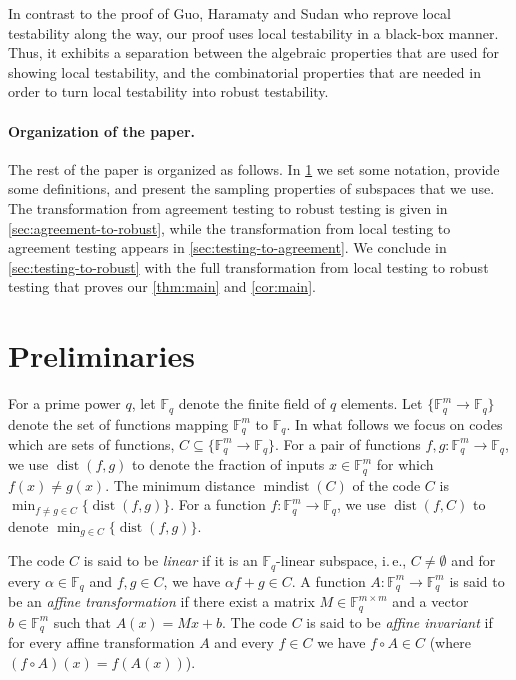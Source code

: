 \documentclass[11pt]{article}
\numberwithin{equation}{section}
\theoremstyle{definition}
\theoremstyle{plain}
\newcommand{\ie}{i.\,e.}
\theoremstyle{plain}
\DeclareMathOperator{\dist}{dist} %
\DeclareMathOperator{\mindist}{mindist}  %
\newcommand{\F}{{\mathbb{F}}}
\newcommand{\Func}[1]{\{\F_q^{#1} \to \F_q\}}
\begin{document}
In contrast to the proof of Guo, Haramaty and Sudan \cite{GuoHS2015} 
who reprove  local testability %
along %
the way, our proof uses local testability in a black-box manner. Thus, it exhibits a separation between the algebraic properties that are used for showing local testability, and the combinatorial properties that  are needed in order to turn local testability into robust testability.

%
%
%
%

%
\paragraph{Organization of the paper.}  %
The rest of the paper is organized as follows. In \cref{sec:prelim} we set some notation, provide some definitions, and present the sampling properties of subspaces that we use. The transformation from agreement testing to robust testing is given in \cref{sec:agreement-to-robust}, while the transformation from local testing to agreement testing
%
appears  %
in \cref{sec:testing-to-agreement}.
We %
%
%
conclude in %
\cref{sec:testing-to-robust} with the full transformation
from local testing to robust testing that proves 
our \cref{thm:main} and \cref{cor:main}.


\section{Preliminaries}\label{sec:prelim}

%
%
%
%
For a prime power $q$, let $\F_q$ denote the finite field of $q$ elements.
Let $\Func{m}$
denote the set of functions mapping $\F_q^m$ to  $\F_q$. In what follows
we focus on codes which are
%
sets  %
of functions, %
$C \subseteq \Func{m}$. For a pair of functions $f,g: \F_q^m \to \F_q$,
we use $\dist(f,g)$ to denote the
fraction of inputs $x \in \F_q^m$ for which $f(x) \ne g(x)$.
The  %
minimum distance   %
$\mindist(C)$ of the code $C$ is $\min_{f \neq g\in C}
\{\dist(f,g)\}$. For a function $f: \F_q^m \to \F_q$,
we use $\dist(f,C)$ to denote $\min_{g \in C}
\{\dist(f,g)\}$.  %

The code $C$ is said to be \emph{linear}
if it is an $\F_q$-linear subspace, 
%
%
%
\ie, $C\neq\emptyset$ and %
for every $\alpha \in \F_q$ and $f,g \in C$, we
have $\alpha f + g \in C$.   %
A function $A:\F_q^m \to \F_q^m$
is said to be an \emph{affine transformation} if there exist a matrix $M \in \F_q^{m \times m}$
and  a vector $b \in \F_q^m$ such that $A(x) = Mx + b$.
The code $C$ is said to be \emph{affine invariant} %
if for every affine transformation $A$ and every $f \in C$
we have $f \circ A \in C$ (where $(f \circ A)(x) = f(A(x))$).
\end{document}
